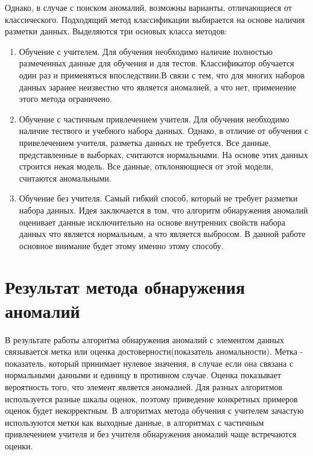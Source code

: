  Однако, в случае с поиском аномалий, возможны варианты, отличающиеся от классического. Подходящий метод классификации выбирается на основе наличия разметки данных.   Выделяются три основых класса методов:
\begin{enumerate}
\item Обучение с учителем. Для обучения необходимо наличие полностью  размеченных данные для обучения и для тестов. Классификатор  обучается один раз и применяться впоследствии.В связи с тем, что для многих наборов данных заранее неизвестно что является аномалией, а что нет, применение этого метода ограничено.
\item Обучение с частичным привлечением учителя. Для обучения необходимо наличие тествого и учебного набора данных. Однако, в отличие от обучения с привелечением учителя, разметка данных не требуется. Все данные, представленные в выборках, считаются нормальными. На основе этих данных строится некая модель. Все данные, отклоняющиеся от этой модели, считаются аномальными.
\item Обучение без учителя.
Самый гибкий способ, который не требует разметки набора данных.  Идея заключается в том, что алгоритм обнаружения аномалий оценивает данные исключительно на основе внутренних свойств набора данных что является нормальным, а что является выбросом. В данной работе основное внимание будет этому  именно этому способу. 
\end{enumerate}

\section*{Результат метода обнаружения аномалий}
В результате работы алгоритма обнаружения аномалий  с элементом данных связывается  метка или оценка достоверности(показатель аномальности).  Метка - показатель, который принимает нулевое значения, в случае если она связана с нормальными данными и единицу в противном случае. Оценка показывает вероятность того, что элемент является аномалией. Для разных алгоритмов используется разные шкалы оценок, поэтому приведение конкретных примеров оценок будет некорректным.  В алгоритмах метода обучения с учителем зачастую используются метки как выходные данные, в  алгоритмах  с частичным привлечением учителя и без учителя  обнаружения аномалий чаще встречаются оценки.


